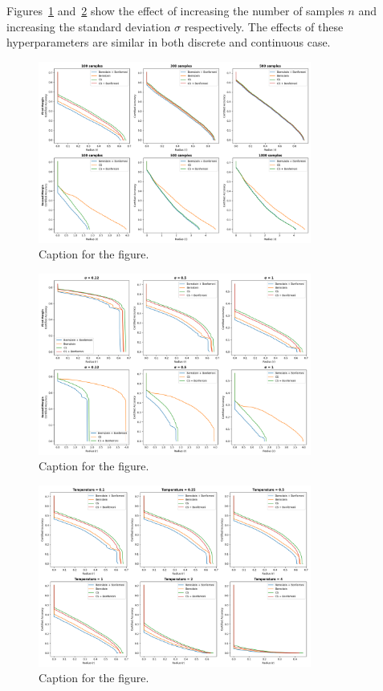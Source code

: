 Figures~\ref{fig:cont_num} and~\ref{fig:cont_sigma} show the effect of increasing the number of samples $n$ and increasing the standard deviation $\sigma$ respectively.
The effects of these hyperparameters are similar in both discrete and continuous case.
\begin{figure}[htbp]
    \centering
    \includegraphics[width=0.8\textwidth]{images/cont_num}
    \caption{Caption for the figure.}
    \label{fig:cont_num}
\end{figure}
\begin{figure}[htbp]
    \centering
    \includegraphics[width=0.8\textwidth]{images/cont_sigma}
    \caption{Caption for the figure.}
    \label{fig:cont_sigma}
\end{figure}
\begin{figure}[htbp]
    \centering
    \includegraphics[width=0.8\textwidth]{images/cont_temp}
    \caption{Caption for the figure.}
    \label{fig:cont_temp}
\end{figure}

